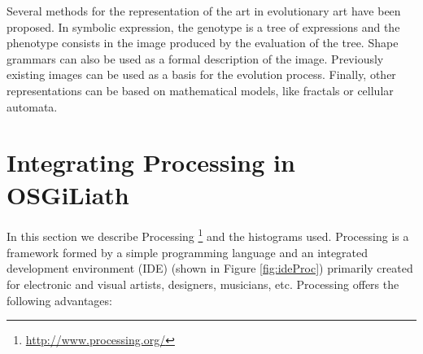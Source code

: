 \begin{table}

\caption{Classification of the aesthetic measures used in a brief review of the literature on evolutive art.} 
\label{table_class} 
\end{table}

Several methods for the representation of the art in evolutionary art have been proposed. In symbolic expression, the genotype is a tree of expressions and the phenotype consists in the image produced  by the evaluation of the tree. Shape grammars can also be used as a formal description of the image. Previously existing images can be used as a basis for the evolution process. Finally, other representations can be based on mathematical models, like fractals or cellular automata.




\section{Integrating Processing in OSGiLiath}
\label{sec:processing}
\noindent In this section we describe Processing \footnote{\url{http://www.processing.org/}} and the histograms used. Processing \cite{PROCESSING} is a framework formed by a simple programming language and an integrated development environment (IDE) (shown in Figure \ref{fig:ideProc}) primarily created for electronic and visual artists, designers, musicians, etc. Processing offers the following advantages:

